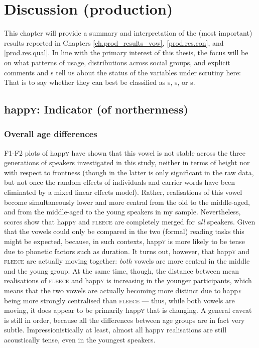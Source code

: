 \chapter{Discussion (production)}
\label{ch.prod_discussion}

This chapter will provide a summary and interpretation of the (most important) results reported in Chapters \ref{ch.prod_results_vow}, \ref{prod.res.con}, and \ref{prod.res.qual}.
In line with the primary interest of this thesis, the focus will be on what patterns of usage, distributions across social groups, and explicit comments and s tell us about the status of the variables under scrutiny here: That is to say whether they can best be classified as s, s, or s.

\section{happ\textrm{\textsc{y}}: Indicator (of northernness)}
\label{prod.disc.happy}

\subsection{Overall age differences}
\label{prod.disc.happy.age}

F1-F2 plots of happ\textsc{y} have shown that this vowel is not stable across the three generations of speakers investigated in this study, neither in terms of height nor with respect to frontness (though  in the latter is only significant in the raw data, but not once the random effects of individuals and carrier words have been eliminated by a mixed linear effects model).
Rather, realisations of this vowel become simultaneously lower and more central from the old to the middle-aged, and from the middle-aged to the young speakers in my sample.
Nevertheless,  scores show that happ\textsc{y} and \textsc{fleece} are completely merged for \emph{all} speakers.
Given that the vowels could only be compared in the two (formal) reading tasks this might be expected, because, in such contexts, happ\textsc{y} is more likely to be tense due to phonetic factors such as duration.
It turns out, however, that happ\textsc{y} and \textsc{fleece} are actually moving together: \emph{both} vowels are more central in the middle and the young group.
At the same time, though, the distance between mean realisations of \textsc{fleece} and happ\textsc{y} is increasing in the younger participants, which means that the two vowels are actually becoming more distinct due to happ\textsc{y} being more strongly centralised than \textsc{fleece} --- thus, while both vowels are moving, it does appear to be primarily happ\textsc{y} that is changing.
A general caveat is still in order, because all the differences between age groups are in fact very subtle.
Impressionistically at least, almost all happ\textsc{y} realisations are still acoustically tense, even in the youngest speakers.

